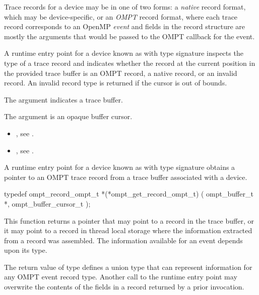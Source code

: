 \descr

Trace records for a device may be in one of two forms: a
\emph{native} record format, which may be device-specific,
or an \emph{OMPT} record format, where each trace record
corresponds to an OpenMP \emph{event} and fields in the record
structure are mostly the arguments that would be passed to the
OMPT callback for the event.

A runtime entry point for a device known as
 with type signature
 inspects the type
of a trace record and indicates whether the record at the current
position in the provided trace buffer is an OMPT record,
a native record, or an invalid record. An invalid record type
is returned if the cursor is out of bounds.

\argdesc
The argument  indicates a trace buffer.

The argument  is an opaque buffer cursor.




\crossreferences
\begin{itemize}
\item {},
see .
\item {},
see .
\end{itemize}

\label{sec:ompt_get_record_ompt_t}

\summary
A runtime entry point for a device known as 
with type signature 
obtains a pointer to an OMPT trace record from a trace buffer associated with a device.

\format
\begin{ccppspecific}
\begin{omptInquiry}
typedef ompt_record_ompt_t *(*ompt_get_record_ompt_t) (
  ompt_buffer_t *,
  ompt_buffer_cursor_t 
);
\end{omptInquiry}
\end{ccppspecific}

\descr

This function returns a pointer that may point to a record in the
trace buffer, or it may point to a record in thread local storage
where the information extracted from a record was assembled. The
information available for an event depends upon its type.

The return value of type 
defines a union type that can represent
information for any OMPT event record type.
Another call to the runtime entry point may overwrite the
contents of the fields in a record returned by a prior invocation.

